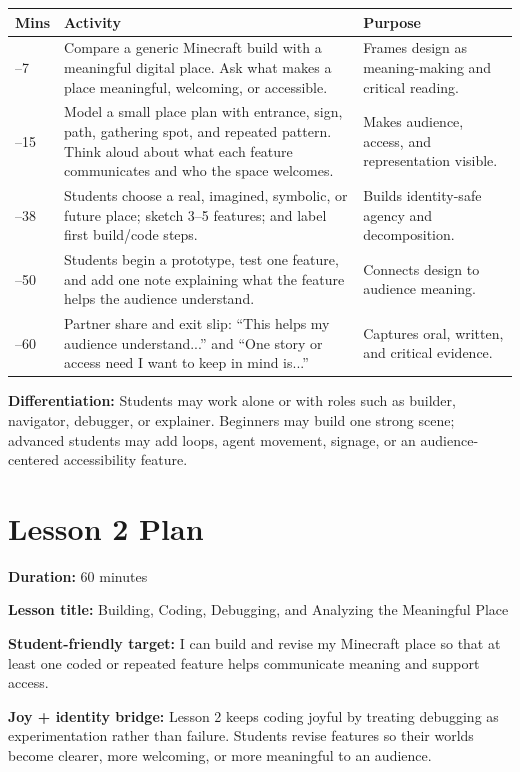 \renewcommand{\arraystretch}{0.82}
\setlength{\tabcolsep}{3pt}
\begin{tabularx}{\textwidth}{|>{\raggedright\arraybackslash}p{}|Y|Y|}
\hline
{}
\textbf{Mins} & \textbf{Activity} & \textbf{Purpose} \\ --7 & Compare a generic Minecraft build with a meaningful digital place. Ask what makes a place meaningful, welcoming, or accessible. & Frames design as meaning-making and critical reading. \\ --15 & Model a small place plan with entrance, sign, path, gathering spot, and repeated pattern. Think aloud about what each feature communicates and who the space welcomes. & Makes audience, access, and representation visible. \\ --38 & Students choose a real, imagined, symbolic, or future place; sketch 3--5 features; and label first build/code steps. & Builds identity-safe agency and decomposition. \\ --50 & Students begin a prototype, test one feature, and add one note explaining what the feature helps the audience understand. & Connects design to audience meaning. \\ --60 & Partner share and exit slip: ``This helps my audience understand...'' and ``One story or access need I want to keep in mind is...'' & Captures oral, written, and critical evidence. \\ \hline
\end{tabularx}

\textbf{Differentiation:} Students may work alone or with roles such as builder, navigator, debugger, or explainer. Beginners may build one strong scene; advanced students may add loops, agent movement, signage, or an audience-centered accessibility feature.

\newpage
\section*{Lesson 2 Plan}

\textbf{Duration:} 60 minutes

\textbf{Lesson title:} Building, Coding, Debugging, and Analyzing the Meaningful Place

\textbf{Student-friendly target:} I can build and revise my Minecraft place so that at least one coded or repeated feature helps communicate meaning and support access.

\textbf{Joy + identity bridge:} Lesson 2 keeps coding joyful by treating debugging as experimentation rather than failure. Students revise features so their worlds become clearer, more welcoming, or more meaningful to an audience.

